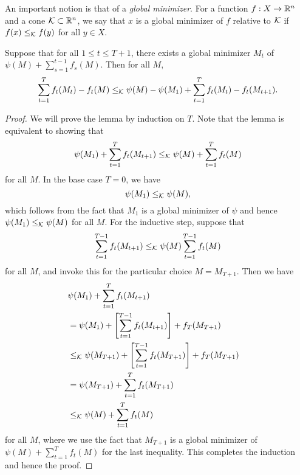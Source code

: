 \documentclass[paper_icml.tex]{subfiles}
\begin{document}
An important notion is that of a \emph{global minimizer}. For a function $f : X \to \mathbb{R}^n$ 
and a cone $\mathcal{K} \subset \mathbb{R}^n$, we say that $x$ is a global minimizer of $f$ 
relative to $\sK$ if $f(x) \leq_{\mathcal{K}} f(y)$ for all $y \in X$.

\begin{lemma}[FTRL-$\sK$]
\label{lem:ftrl-k}
Suppose that for all $1 \leq t \leq T+1$, there 
exists a global minimizer $M_t$ of 
$\psi(M) + \sum_{s=1}^{t-1} f_s(M)$. Then for all $M$,
\begin{dmath} \sum_{t=1}^T f_t(M_t)-f_t(M) \leq_{\sK} \psi(M) - \psi(M_1) + \sum_{t=1}^T f_t(M_{t}) - f_t(M_{t+1}). \end{dmath}
\end{lemma}
\begin{proof}
We will prove the lemma by induction on $T$. Note that the lemma is equivalent to showing that 
\[ \psi(M_1) + \sum_{t=1}^T f_t(M_{t+1}) \leq_{\mathcal{K}} \psi(M) + \sum_{t=1}^T f_t(M) \]
for all $M$. In the base case $T = 0$, we have
\[ \psi(M_1) \leq_{\mathcal{K}} \psi(M), \]
which follows from the fact that $M_1$ is a global minimizer of $\psi$ and 
hence $\psi(M_1) \leq_{\mathcal{K}} \psi(M)$ for all $M$. For the inductive step, suppose that
\[ \sum_{t=1}^{T-1} f_t(M_{t+1}) \leq_{\mathcal{K}} \psi(M) \sum_{t=1}^{T-1} f_t(M) \]
for all $M$, and invoke this for the particular choice $M = M_{T+1}$. Then we have
\begin{align*}
\lefteqn{\psi(M_1) + \sum_{t=1}^T f_t(M_{t+1})} \\
 &= \psi(M_1) + \left[\sum_{t=1}^{T-1} f_t(M_{t+1})\right] + f_T(M_{T+1}) \\
 &\leq_{\sK} \psi(M_{T+1}) + \left[\sum_{t=1}^{T-1} f_t(M_{T+1})\right] + f_T(M_{T+1}) \\
 &= \psi(M_{T+1}) + \sum_{t=1}^T f_t(M_{T+1}) \\
 &\leq_{\sK} \psi(M) + \sum_{t=1}^T f_t(M)
\end{align*}
for all $M$, where we use the fact that $M_{T+1}$ is a global minimizer of $\psi(M) + \sum_{t=1}^T f_t(M)$ for 
the last inequality. This completes the induction and hence the proof.
\end{proof}
\end{document}
